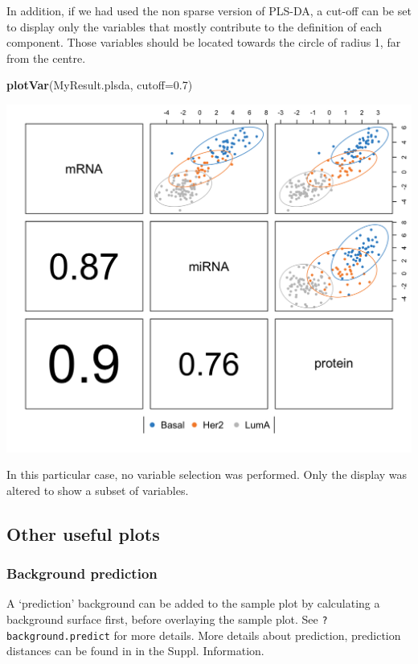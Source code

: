 \documentclass[]{book}
\newenvironment{Shaded}{\begin{snugshade}}{\end{snugshade}}
\newcommand{\KeywordTok}[1]{\textcolor[rgb]{0.13,0.29,0.53}{\textbf{#1}}}
\newcommand{\DataTypeTok}[1]{\textcolor[rgb]{0.13,0.29,0.53}{#1}}
\newcommand{\FloatTok}[1]{\textcolor[rgb]{0.00,0.00,0.81}{#1}}
\newcommand{\NormalTok}[1]{#1}
\theoremstyle{definition}
\theoremstyle{definition}
\theoremstyle{definition}
\theoremstyle{remark}
\begin{document}
In addition, if we had used the non sparse version of PLS-DA, a cut-off
can be set to display only the variables that mostly contribute to the
definition of each component. Those variables should be located towards
the circle of radius 1, far from the centre.

\begin{Shaded}
\begin{Highlighting}[]
\KeywordTok{plotVar}\NormalTok{(MyResult.plsda, }\DataTypeTok{cutoff=}\FloatTok{0.7}\NormalTok{)}
\end{Highlighting}
\end{Shaded}

\begin{center}\includegraphics[width=0.5\linewidth]{Figures/unnamed-chunk-6-1} \end{center}

In this particular case, no variable selection was performed. Only the
display was altered to show a subset of variables.

\subsection{Other useful plots}\label{other-useful-plots-1}

\subsubsection{Background prediction}\label{background-prediction}

A `prediction' background can be added to the sample plot by calculating
a background surface first, before overlaying the sample plot. See
\texttt{?background.predict} for more details. More details about
prediction, prediction distances can be found in \citep{mixomics} in the
Suppl. Information.
\end{document}
